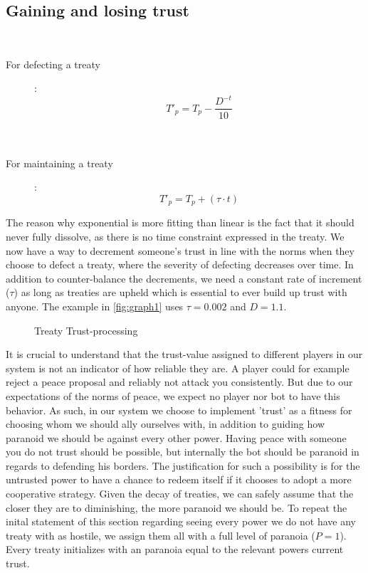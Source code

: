 \documentclass[a4paper]{article} %
\begin{document}
\subsection{Gaining and losing trust}
\
\begin{description}
\item[For defecting a treaty]: 
$$T'_p = T_p - \frac{D^{-t}} {10}$$ \\
\
\item[For maintaining a treaty]: 
$$T'_p = T_p + (\tau \cdot t)$$
\end{description}

The reason why exponential is more fitting than linear is the fact that it should never fully dissolve, as there is no time constraint expressed in the treaty. We now have a way to decrement someone's trust in line with the norms when they choose to defect a treaty, where the severity of defecting decreases over time. In addition to counter-balance the decrements, we need a constant rate of increment ($\tau$) as long as treaties are upheld which is essential to ever build up trust with anyone. The example in \autoref{fig:graph1} uses $\tau = 0.002$ and $D = 1.1$.

\begin{figure}[H]
\centering
{}
\caption{Treaty Trust-processing}
\label{fig:graph1}
\end{figure}

It is crucial to understand that the trust-value assigned to different players in our system is not an indicator of how reliable they are. A player could for example reject a peace proposal and reliably not attack you consistently. But due to our expectations of the norms of peace, we expect no player nor bot to have this behavior. As such, in our system we choose to implement 'trust' as a fitness for choosing whom we should ally ourselves with, in addition to guiding how paranoid we should be against every other power. Having peace with someone you do not trust should be possible, but internally the bot should be paranoid in regards to defending his borders. The justification for such a possibility is for the untrusted power to have a chance to redeem itself if it chooses to adopt a more cooperative strategy. Given the decay of treaties, we can safely assume that the closer they are to diminishing, the more paranoid we should be. To repeat the inital statement of this section regarding seeing every power we do not have any treaty with as hostile, we assign them all with a full level of paranoia ($P = 1$). Every treaty initializes with an paranoia equal to the relevant powers current trust. 
\end{document}
